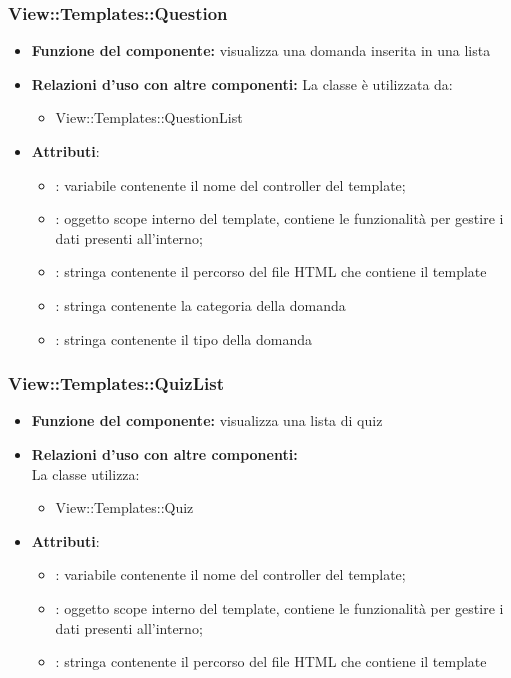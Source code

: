 \subsubsection{View::Templates::Question}
\begin{itemize}
\item\textbf{Funzione del componente:} visualizza una domanda inserita in una lista
				\item\textbf{Relazioni d'uso con altre componenti:} 
La classe è utilizzata da:
\begin{itemize}
		\item View::Templates::QuestionList
	\end{itemize}
\item\textbf{Attributi}:
	\begin{itemize}
		\item{}: variabile contenente il nome del controller del template;\\
		\item{}: oggetto scope interno del template, contiene le funzionalità per gestire i dati presenti all’interno;\\
		\item{}: stringa contenente il percorso del file HTML che contiene il template\\
		\item{}: stringa contenente la categoria della domanda
		\item{}: stringa contenente il tipo della domanda
	\end{itemize}
\end{itemize}

\subsubsection{View::Templates::QuizList}
\begin{itemize}
\item\textbf{Funzione del componente:} visualizza una lista di quiz
				\item\textbf{Relazioni d'uso con altre componenti:}\\
La classe utilizza:
	\begin{itemize}
		\item View::Templates::Quiz
	\end{itemize}
\item\textbf{Attributi}:
	\begin{itemize}
		\item{}: variabile contenente il nome del controller del template;\\
		\item{}: oggetto scope interno del template, contiene le funzionalità per gestire i dati presenti all’interno;\\
		\item{}: stringa contenente il percorso del file HTML che contiene il template\\
	\end{itemize}
\end{itemize}

